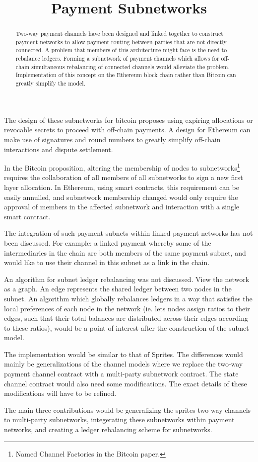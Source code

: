 \documentclass[12pt]{article}
\title{Payment Subnetworks\vspace{-5em}}
\date{}
\author{}
\begin{document}
\maketitle
\begin{abstract}
Two-way payment channels have been designed and linked together to construct payment networks to allow payment routing between parties that are not directly connected. A problem that members of this architecture might face is the need to rebalance ledgers. Forming a subnetwork of payment channels which allows for off-chain simultaneous rebalancing of connected channels would alleviate the problem. Implementation of this concept on the Ethereum block chain rather than Bitcoin can greatly simplify the model.
\end{abstract}

The design of these subnetworks for bitcoin proposes using expiring allocations or revocable secrets to proceed with off-chain payments. A design for Ethereum can make use of signatures and round numbers to greatly simplify off-chain interactions and dispute settlement.

In the Bitcoin proposition, altering the membership of nodes to subnetworks\footnote{Named Channel Factories in the Bitcoin paper.} requires the collaboration of all members of all subnetworks to sign a new first layer allocation. In Ethereum, using smart contracts, this requirement can be easily annulled, and subnetwork membership changed would only require the approval of members in the affected subnetwork and interaction with a single smart contract.

The integration of such payment subnets within linked payment networks has not been discussed. For example: a linked payment whereby some of the intermediaries in the chain are both members of the same payment subnet, and would like to use their channel in this subnet as a link in the chain.

An algorithm for subnet ledger rebalancing was not discussed. View the network as a graph. An edge represents the shared ledger between two nodes in the subnet. An algorithm which globally rebalances ledgers in a way that satisfies the local preferences of each node in the network (ie. lets nodes assign ratios to their edges, such that their total balances are distributed across their edges according to these ratios), would be a point of interest after the construction of the subnet model.

The implementation would be similar to that of Sprites. The differences would mainly be generalizations of the channel models where we replace the two-way payment channel contract with a multi-party subnetwork contract. The state channel contract would also need some modifications. The exact details of these modifications will have to be refined.

The main three contributions would be generalizing the sprites two way channels to multi-party subnetworks, integerating these subnetworks within payment networks, and creating a ledger rebalancing scheme for subnetworks.
\end{document}
